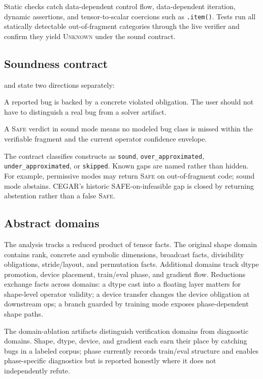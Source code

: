 \documentclass[11pt]{article}
\newcommand{\safe}{\textsc{Safe}}
\newcommand{\unknown}{\textsc{Unknown}}
\begin{document}
Static checks catch data-dependent control flow, data-dependent iteration,
dynamic assertions, and tensor-to-scalar coercions such as \texttt{.item()}.
Tests run all statically detectable out-of-fragment categories through the
live verifier and confirm they yield \unknown{} under the sound contract.

\subsection{Soundness contract}

 and  state two
directions separately:

\begin{description}[leftmargin=2em]
  \item[Refutation soundness.] A reported bug is backed by a concrete violated
  obligation.  The user should not have to distinguish a real bug from a solver
  artifact.
  \item[Verification soundness.] A \safe{} verdict in sound mode means no
  modeled bug class is missed within the verifiable fragment and the current
  operator confidence envelope.
\end{description}

The contract classifies constructs as \texttt{sound},
\texttt{over\_approximated}, \texttt{under\_approximated}, or \texttt{skipped}.
Known gaps are named rather than hidden.  For example, permissive modes may
return \safe{} on out-of-fragment code; sound mode abstains.  CEGAR's historic
SAFE-on-infeasible gap is closed by returning abstention rather than a false
\safe{}.

\subsection{Abstract domains}

The analysis tracks a reduced product of tensor facts.  The original shape
domain contains rank, concrete and symbolic dimensions, broadcast facts,
divisibility obligations, stride/layout, and permutation facts.  Additional
domains track dtype promotion, device placement, train/eval phase, and gradient
flow.  Reductions exchange facts across domains: a dtype cast into a floating
layer matters for shape-level operator validity; a device transfer changes the
device obligation at downstream ops; a branch guarded by training mode exposes
phase-dependent shape paths.

The domain-ablation artifacts distinguish verification domains from diagnostic
domains.  Shape, dtype, device, and gradient each earn their place by catching
bugs in a labeled corpus; phase currently records train/eval structure and
enables phase-specific diagnostics but is reported honestly where it does not
independently refute.
\end{document}
